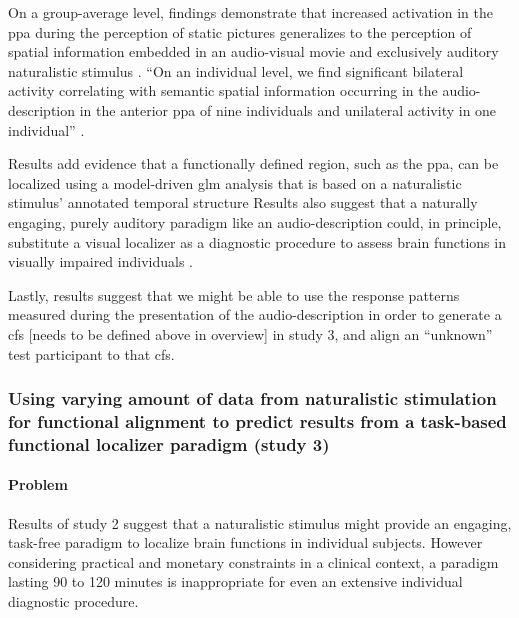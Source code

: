 On a group-average level, findings demonstrate that increased activation in the
\ac{ppa} during the perception of static pictures generalizes to the perception
of spatial information embedded in an audio-visual movie and exclusively
auditory naturalistic stimulus
\citep{haeusler2022processing}.
``On an individual level, we find significant bilateral activity correlating
with semantic spatial information occurring in the audio-description in the
anterior \ac{ppa} of nine individuals and unilateral activity in one
individual'' \citep{haeusler2022processing}.

Results add evidence \citep[cf.][]{bartels2004mapping} that a functionally
defined region, such as the \ac{ppa}, can be localized using a model-driven
\ac{glm} analysis that is based on a naturalistic stimulus' annotated temporal
structure
Results also suggest that a naturally engaging, purely auditory paradigm like an
audio-description could, in principle, substitute a visual localizer as a
diagnostic procedure to assess brain functions in visually impaired individuals
\citep{haeusler2022processing}.



Lastly, results suggest that we might be able to use the response patterns
measured during the presentation of the audio-description in order to generate a
\ac{cfs} [needs to be defined above in overview] in study 3, and
align an ``unknown'' test participant to that \ac{cfs}.


\subsubsection{Using varying amount of data from naturalistic stimulation for
functional alignment to predict results from a task-based functional localizer
paradigm (study 3)}






\paragraph{Problem}
Results of study 2 suggest that a naturalistic stimulus might provide an
engaging, task-free paradigm to localize brain functions in individual subjects.
%
However considering practical and monetary constraints in a clinical context, a
paradigm lasting 90 to 120 minutes is inappropriate for even an extensive
individual diagnostic procedure.


